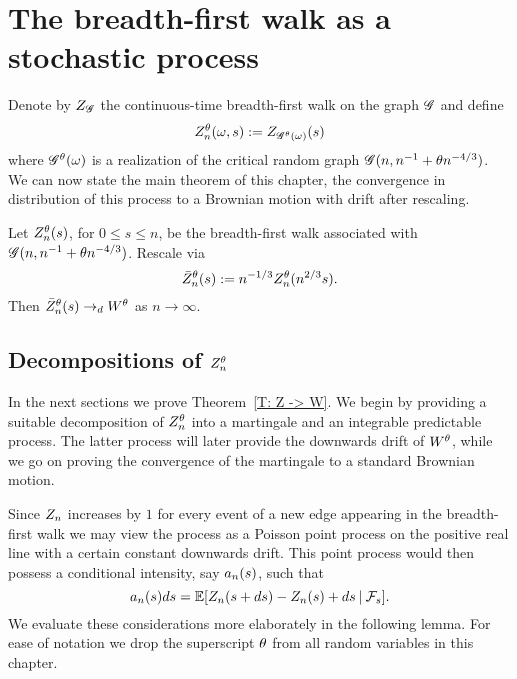 \section{The breadth-first walk as a stochastic process}

Denote by $Z_{\mathscr{G}}$ the continuous-time breadth-first walk on the graph $\mathscr{G}$
and define
\begin{equation} \label{D: znt}
	Z_n^{\theta}(\omega, s) := Z_{\mathscr{G}^{\theta}(\omega)}(s)
\end{equation}
where $\mathscr{G}^{\theta}(\omega)$ is a realization of the critical random graph $\mathscr{G}(n, n^{-1} + \theta n^{-4/3})$.
We can now state the main theorem of this chapter,
the convergence in distribution of this process to a Brownian motion with drift after rescaling.

\begin{theorem} \label{T: Z -> W}
	Let $Z_n^{\theta}(s)$, for $0 \leq s \leq n$, 
	be the breadth-first walk associated with $\mathscr{G}(n, n^{-1} + \theta n^{-4/3})$.
	Rescale via
	\begin{equation}
	\bar{Z}^{\theta}_n(s) := n^{-1 / 3} Z_n^{\theta}(n^{2 / 3}s).
	\end{equation}
	Then $\bar{Z}^{\theta}_n(s) \rightarrow_d W^{\theta}$ as $n \rightarrow \infty$.
\end{theorem}


\subsection{Decompositions of $Z_n^{\theta}$}

In the next sections we prove Theorem~\ref{T: Z -> W}.
We begin by providing a suitable decomposition of $Z_n^{\theta}$ into a martingale and
an integrable predictable process.
The latter process will later provide the downwards drift of $W^{\theta}$,
while we go on proving the convergence of the martingale to a standard Brownian motion.

Since $Z_n$ increases by $1$ for every event of a new edge appearing in the breadth-first walk
we may view the process as a Poisson point process on the positive real line with a certain constant downwards drift.
This point process would then possess a conditional intensity, say $a_n(s)$, such that
\begin{equation}
	a_n(s)ds = \mathbb{E}[ Z_n(s + ds) - Z_n(s) + ds \: | \: \mathcal{F}_{s} ].
\end{equation}
We evaluate these considerations more elaborately in the following lemma.
For ease of notation we drop the superscript $\theta$ from all random variables in this chapter.

